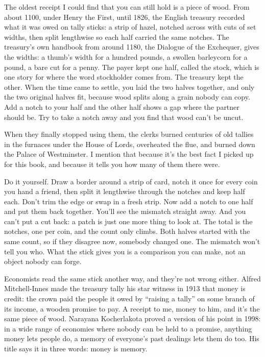\documentclass[11pt,twoside]{article}
\theoremstyle{thielethm}
\theoremstyle{thieledef}
\theoremstyle{thieledef}
\theoremstyle{thieledef}
\theoremstyle{thielethm}
\theoremstyle{thieleobs}
\theoremstyle{thielethm}
\begin{document}
The oldest receipt I could find that you can still hold is a piece of wood. From about 1100, under Henry the First, until 1826, the English treasury recorded what it was owed on tally sticks: a strip of hazel, notched across with cuts of set widths, then split lengthwise so each half carried the same notches. The treasury's own handbook from around 1180, the Dialogue of the Exchequer, gives the widths: a thumb's width for a hundred pounds, a swollen barleycorn for a pound, a bare cut for a penny. The payer kept one half, called the stock, which is one story for where the word stockholder comes from. The treasury kept the other. When the time came to settle, you laid the two halves together, and only the two original halves fit, because wood splits along a grain nobody can copy. Add a notch to your half and the other half shows a gap where the partner should be. Try to take a notch away and you find that wood can't be uncut.

When they finally stopped using them, the clerks burned centuries of old tallies in the furnaces under the House of Lords, overheated the flue, and burned down the Palace of Westminster. I mention that because it's the best fact I picked up for this book, and because it tells you how many of them there were.

Do it yourself. Draw a border around a strip of card, notch it once for every coin you hand a friend, then split it lengthwise through the notches and keep half each. Don't trim the edge or swap in a fresh strip. Now add a notch to one half and put them back together. You'll see the mismatch straight away. And you can't put a cut back: a patch is just one more thing to look at. The total is the notches, one per coin, and the count only climbs. Both halves started with the same count, so if they disagree now, somebody changed one. The mismatch won't tell you who. What the stick gives you is a comparison you can make, not an object nobody can forge.

Economists read the same stick another way, and they're not wrong either. Alfred Mitchell-Innes made the treasury tally his star witness in 1913 that money is credit: the crown paid the people it owed by ``raising a tally'' on some branch of its income, a wooden promise to pay. A receipt to me, money to him, and it's the same piece of wood. Narayana Kocherlakota proved a version of his point in 1998: in a wide range of economies where nobody can be held to a promise, anything money lets people do, a memory of everyone's past dealings lets them do too. His title says it in three words: money is memory.
\end{document}
